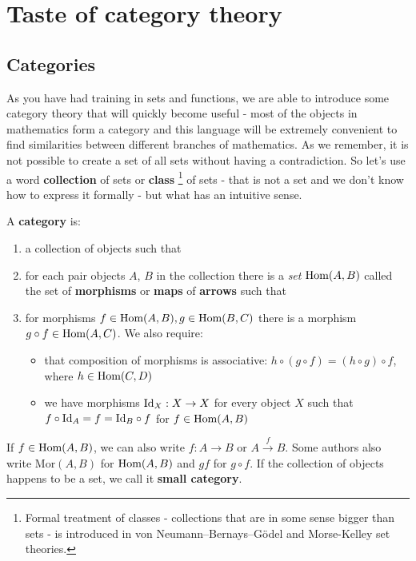 \chapter{Taste of category theory}
\section{Categories}
As you have had training in sets and functions, we are able to introduce some category theory that will quickly become useful - most of the objects in mathematics form a
category and this language will be extremely convenient to find similarities between different branches of mathematics.
As we remember, it is not possible to create a set of all sets without having a contradiction. So let's use a word \textbf{collection} of sets or \textbf{class}
\footnote{Formal treatment of classes - collections that are in some sense bigger than sets - is introduced in von Neumann–Bernays–Gödel and Morse-Kelley set theories.}
 of sets - that is not a set and we don't know how to express it formally - but what has an intuitive sense.

\begin{definition}
  A \textbf{category} is:
  \begin{enumerate}
    \item a collection of objects such that
    \item for each pair objects $A$, $B$ in the collection there is a \emph{set} $\text{Hom}(A,B)$ called the set of \textbf{morphisms} or \textbf{maps} of \textbf{arrows} such that
    \item for morphisms $f\in \text{Hom}(A,B), g\in \text{Hom}(B,C)$ there is a morphism $g\circ f\in \text{Hom}(A,C)$. We also require:
      \begin{itemize}
        \item that composition of morphisms is associative: $h\circ(g\circ f)=(h\circ g)\circ f$, where $h\in \text{Hom}(C, D)$
        \item we have morphisms $\text{Id}_X: X\to X$ for every object $X$ such that $f\circ\text{Id}_A = f=\text{Id}_B\circ f$ for $f\in \text{Hom}(A,B)$
      \end{itemize}
  \end{enumerate}
  If $f\in \text{Hom}(A,B)$, we can also write $f:A\to B$ or $A\xrightarrow{f} B$. Some authors also write $\text{Mor}(A,B)$ for $\text{Hom}(A,B)$ and $gf$ for $g\circ f$. If the collection of objects happens
  to be a set, we call it \textbf{small category}.
\end{definition}


